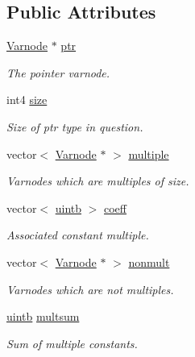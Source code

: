 \subsection*{Public Attributes}
\begin{DoxyCompactItemize}
\item 
\mbox{\hyperlink{class_varnode}{Varnode}} $\ast$ \mbox{\hyperlink{class_add_tree_state_a18bd4ef288bdc8a93a620c4aec983668}{ptr}}
\begin{DoxyCompactList}\small\item\em The pointer varnode. \end{DoxyCompactList}\item 
int4 \mbox{\hyperlink{class_add_tree_state_a535bcd4be85c95843d2cae3572e027a3}{size}}
\begin{DoxyCompactList}\small\item\em Size of ptr type in question. \end{DoxyCompactList}\item 
vector$<$ \mbox{\hyperlink{class_varnode}{Varnode}} $\ast$ $>$ \mbox{\hyperlink{class_add_tree_state_a33cf1a3308a896062f44f575c79bb161}{multiple}}
\begin{DoxyCompactList}\small\item\em Varnodes which are multiples of size. \end{DoxyCompactList}\item 
vector$<$ \mbox{\hyperlink{types_8h_a2db313c5d32a12b01d26ac9b3bca178f}{uintb}} $>$ \mbox{\hyperlink{class_add_tree_state_aeb468ac572e503ef8ec084e9f0c1b766}{coeff}}
\begin{DoxyCompactList}\small\item\em Associated constant multiple. \end{DoxyCompactList}\item 
vector$<$ \mbox{\hyperlink{class_varnode}{Varnode}} $\ast$ $>$ \mbox{\hyperlink{class_add_tree_state_ac11cb69f9f85a57c23ddd3fe369bfbff}{nonmult}}
\begin{DoxyCompactList}\small\item\em Varnodes which are not multiples. \end{DoxyCompactList}\item 
\mbox{\hyperlink{types_8h_a2db313c5d32a12b01d26ac9b3bca178f}{uintb}} \mbox{\hyperlink{class_add_tree_state_acbfd064f5fab88778d1a82d6e1bf210c}{multsum}}
\begin{DoxyCompactList}\small\item\em Sum of multiple constants. \end{DoxyCompactList}\item 

\end{DoxyCompactItemize}
